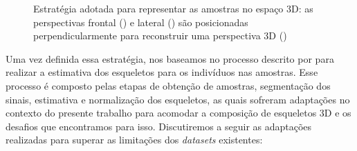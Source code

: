 \begin{figure}[ht!]
    \centering
    \caption{\textmd{Estratégia adotada para representar as amostras no espaço 3D: as perspectivas frontal () e lateral () são posicionadas perpendicularmente para reconstruir uma perspectiva 3D ()}}
    \nomefonte{}
    \label{fig:our-strategy-3d}
\end{figure}


Uma vez definida essa estratégia, nos baseamos no processo descrito por  para realizar a estimativa dos esqueletos para os indivíduos nas amostras. Esse processo é composto pelas etapas de obtenção de amostras, segmentação dos sinais, estimativa e normalização dos esqueletos, as quais sofreram adaptações no contexto do presente trabalho para acomodar a composição de esqueletos 3D e os desafios que encontramos para isso. Discutiremos a seguir as adaptações realizadas para superar as limitações dos \textit{datasets} existentes:

